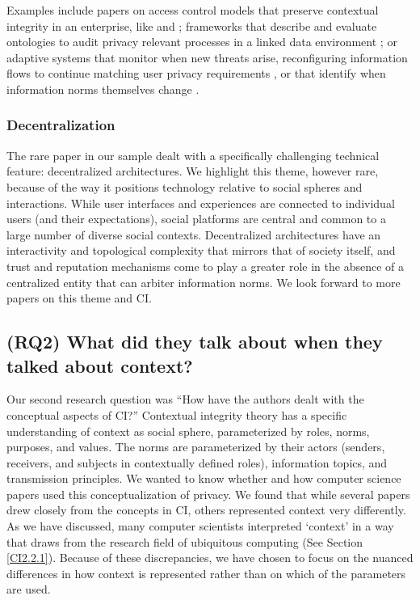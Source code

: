 \documentclass[../thesis.tex]{subfiles}
\begin{document}
Examples include papers on access control models that preserve
contextual integrity in an enterprise, like \citet{barth06sp} and
\citet{barth07csf}; frameworks that describe and evaluate ontologies
to audit privacy relevant processes in a linked data environment
\cite{samavi2012l2tap+}; or adaptive systems that monitor when new
threats arise, reconfiguring information flows to continue matching
user privacy requirements \cite{omoronyia2012caprice},
or that identify
when information norms themselves change \cite{shvartzshnaider2016learning}. 

\subsubsection{Decentralization}
\label{CI4.1.3}

The rare paper in our sample dealt with a specifically challenging
technical feature: decentralized architectures. We highlight this
theme, however rare, because of the way it positions technology
relative to social spheres and interactions. While user interfaces and
experiences are connected to individual users (and their expectations),
social platforms are central and common to a large number of diverse
social contexts. Decentralized architectures have an interactivity and
topological complexity that mirrors that of society itself, and trust
and reputation mechanisms come to play a greater role in the absence of
a centralized entity that can arbiter information norms. We look
forward to more papers on this theme and CI.

\subsection{(RQ2) What did they talk about when they talked about context?}
\label{CI4.2}

Our second research question was ``How have the authors
dealt with the conceptual aspects of CI?'' Contextual
integrity theory has a specific understanding of context as social
sphere, parameterized by roles, norms, purposes, and values. The norms
are parameterized by their actors (senders, receivers, and subjects in
contextually defined roles), information topics, and transmission
principles. We wanted to know whether and how computer science papers
used this conceptualization of privacy. We found that while several
papers drew closely from the concepts in CI, others represented context
very differently. As we have discussed, many computer scientists
interpreted `context' in a way that
draws from the research field of ubiquitous computing (See Section
\ref{CI2.2.1}). Because of these discrepancies, we have chosen to focus on the
nuanced differences in how context is represented rather than on which
of the parameters are used.
\end{document}
